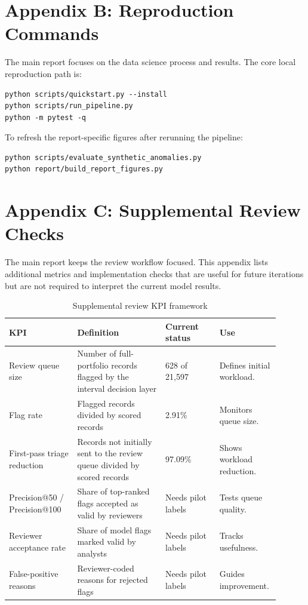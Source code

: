 \documentclass[12pt,a4paper]{article}
\begin{document}
\section{Appendix B: Reproduction Commands}
The main report focuses on the data science process and results. The core local reproduction path is:

\begin{verbatim}
python scripts/quickstart.py --install
python scripts/run_pipeline.py
python -m pytest -q
\end{verbatim}

To refresh the report-specific figures after rerunning the pipeline:

\begin{verbatim}
python scripts/evaluate_synthetic_anomalies.py
python report/build_report_figures.py
\end{verbatim}

\section{Appendix C: Supplemental Review Checks}
The main report keeps the review workflow focused. This appendix lists additional metrics and implementation checks that are useful for future iterations but are not required to interpret the current model results.

\begin{table}[H]
\centering
\caption{Supplemental review KPI framework}
\label{tab:business_kpis}
\begin{tabular}{p{0.24\linewidth}p{0.31\linewidth}p{0.19\linewidth}p{0.16\linewidth}}
\toprule
\textbf{KPI} & \textbf{Definition} & \textbf{Current status} & \textbf{Use}\\
\midrule
Review queue size & Number of full-portfolio records flagged by the interval decision layer & 628 of 21,597 & Defines initial workload.\\
Flag rate & Flagged records divided by scored records & 2.91\% & Monitors queue size.\\
First-pass triage reduction & Records not initially sent to the review queue divided by scored records & 97.09\% & Shows workload reduction.\\
Precision@50 / Precision@100 & Share of top-ranked flags accepted as valid by reviewers & Needs pilot labels & Tests queue quality.\\
Reviewer acceptance rate & Share of model flags marked valid by analysts & Needs pilot labels & Tracks usefulness.\\
False-positive reasons & Reviewer-coded reasons for rejected flags & Needs pilot labels & Guides improvement.\\
\bottomrule
\end{tabular}
\end{table}
\end{document}
